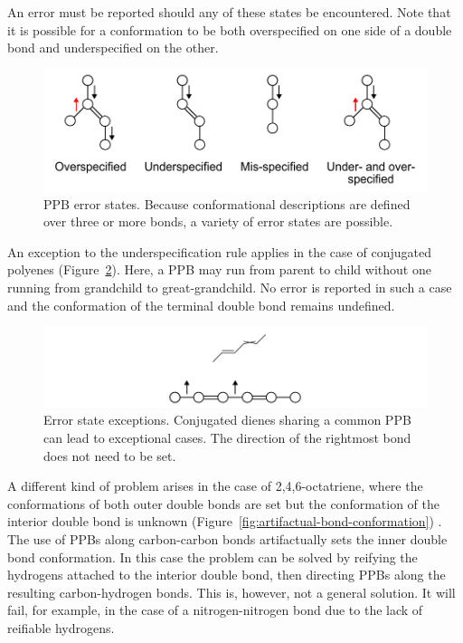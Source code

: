 \documentclass{article}
\begin{document}
An error must be reported should any of these states be encountered. Note that it is possible for a conformation to be both overspecified on one side of a double bond and underspecified on the other.

\begin{figure}
    \centering
    \includegraphics[width=\columnwidth]{ppb-error-states.pdf}
    \caption{PPB error states. Because conformational descriptions are defined over three or more bonds, a variety of error states are possible.}
    \label{fig:bond-error-states}
\end{figure}

An exception to the underspecification rule applies in the case of conjugated polyenes (Figure~\ref{fig:bond-error-state-exceptions}). Here, a PPB may run from parent to child without one running from grandchild to great-grandchild. No error is reported in such a case and the conformation of the terminal double bond remains undefined.

\begin{figure}
    \centering
    \includegraphics[width=\columnwidth]{ppb-error-state-exception.pdf}
    \caption{Error state exceptions. Conjugated dienes sharing a common PPB can lead to exceptional cases. The direction of the rightmost bond does not need to be set.}
    \label{fig:bond-error-state-exceptions}
\end{figure}

A different kind of problem arises in the case of 2,4,6-octatriene, where the conformations of both outer double bonds are set but the conformation of the interior double bond is unknown (Figure~\ref{fig:artifactual-bond-conformation}) \cite{mayfield:2022}. The use of PPBs along carbon-carbon bonds artifactually sets the inner double bond conformation. In this case the problem can be solved by reifying the hydrogens attached to the interior double bond, then directing PPBs along the resulting carbon-hydrogen bonds. This is, however, not a general solution. It will fail, for example, in the case of a nitrogen-nitrogen bond due to the lack of reifiable hydrogens.
\end{document}

